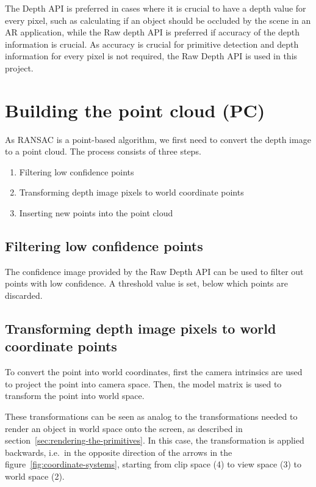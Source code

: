 

The Depth API is preferred in cases where it is crucial to have a depth value for every pixel, such as calculating if an object should be occluded by the scene in an AR application,
while the Raw depth API is preferred if accuracy of the depth information is crucial. \parencite{google_llc_arcore_doc}
As accuracy is crucial for primitive detection and depth information for every pixel is not required, the Raw Depth API is used in this project.

\section{Building the point cloud (PC)}
As RANSAC is a point-based algorithm, we first need to convert the depth image to a point cloud.
The process consists of three steps.
\begin{enumerate}
    \item Filtering low confidence points
    \item Transforming depth image pixels to world coordinate points
    \item Inserting new points into the point cloud
\end{enumerate}

\subsection{Filtering low confidence points}
The confidence image provided by the Raw Depth API can be used to filter out points with low confidence.
A threshold value is set, below which points are discarded.

\subsection{Transforming depth image pixels to world coordinate points}
To convert the point into world coordinates, first the camera intrinsics are used to
project the point into camera space.
Then, the model matrix is used to transform the point into world space.
\parencite{google_llc_codelab_raw_depth,google_llc_arcore_doc}

These transformations can be seen as analog to the transformations needed to
render an object in world space onto the screen, as described in section~\ref{sec:rendering-the-primitives}.
In this case, the transformation is applied backwards, i.e.\ in the opposite direction of the arrows
in the figure~\ref{fig:coordinate-systems}, starting from clip space (4) to view space (3) to world space (2).


